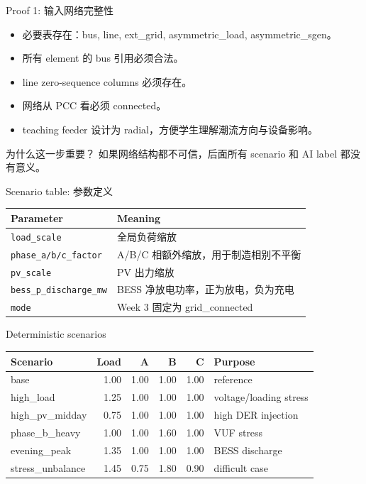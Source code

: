 \documentclass[aspectratio=169,11pt]{beamer}
\begin{document}
\begin{frame}{Proof 1: 输入网络完整性}
\begin{itemize}
  \item 必要表存在：bus, line, ext\_grid, asymmetric\_load, asymmetric\_sgen。
  \item 所有 element 的 bus 引用必须合法。
  \item line zero-sequence columns 必须存在。
  \item 网络从 PCC 看必须 connected。
  \item teaching feeder 设计为 radial，方便学生理解潮流方向与设备影响。
\end{itemize}
\begin{block}{为什么这一步重要？}
如果网络结构都不可信，后面所有 scenario 和 AI label 都没有意义。
\end{block}
\end{frame}

\begin{frame}{Scenario table: 参数定义}
\begin{table}
\centering
\scriptsize
\begin{tabular}{ll}
\toprule
Parameter & Meaning \\
\midrule
\texttt{load\_scale} & 全局负荷缩放 \\
\texttt{phase\_a/b/c\_factor} & A/B/C 相额外缩放，用于制造相别不平衡 \\
\texttt{pv\_scale} & PV 出力缩放 \\
\texttt{bess\_p\_discharge\_mw} & BESS 净放电功率，正为放电，负为充电 \\
\texttt{mode} & Week 3 固定为 grid\_connected \\
\bottomrule
\end{tabular}
\end{table}
\end{frame}

\begin{frame}{Deterministic scenarios}
\begin{table}
\centering
\scriptsize
\begin{tabular}{lrrrrl}
\toprule
Scenario & Load & A & B & C & Purpose \\
\midrule
base & 1.00 & 1.00 & 1.00 & 1.00 & reference \\
high\_load & 1.25 & 1.00 & 1.00 & 1.00 & voltage/loading stress \\
high\_pv\_midday & 0.75 & 1.00 & 1.00 & 1.00 & high DER injection \\
phase\_b\_heavy & 1.00 & 1.00 & 1.60 & 1.00 & VUF stress \\
evening\_peak & 1.35 & 1.00 & 1.00 & 1.00 & BESS discharge \\
stress\_unbalance & 1.45 & 0.75 & 1.80 & 0.90 & difficult case \\
\bottomrule
\end{tabular}
\end{table}
\end{frame}
\end{document}

